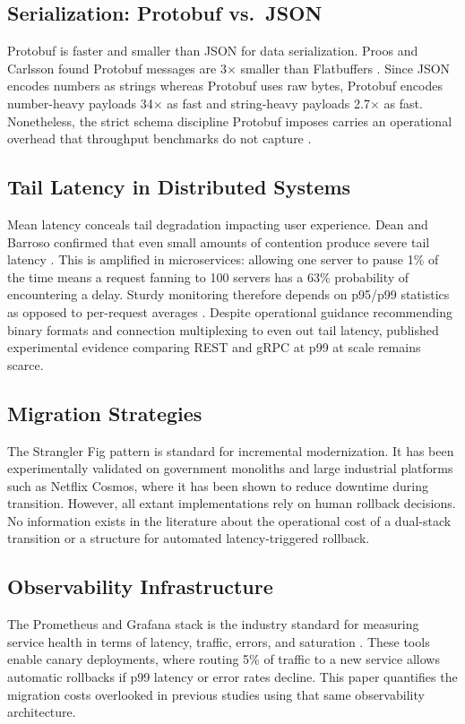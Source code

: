 \documentclass[conference]{IEEEtran}
\begin{document}
\subsection{Serialization: Protobuf vs.\ JSON}
Protobuf is faster and smaller than JSON for data serialization. Proos and Carlsson found Protobuf messages are 3$\times$ smaller than Flatbuffers \cite{proos2020}. Since JSON encodes numbers as strings whereas Protobuf uses raw bytes, Protobuf encodes number-heavy payloads 34$\times$ as fast and string-heavy payloads 2.7$\times$ as fast. Nonetheless, the strict schema discipline Protobuf imposes carries an operational overhead that throughput benchmarks do not capture \cite{popic2016}.

\subsection{Tail Latency in Distributed Systems}
Mean latency conceals tail degradation impacting user experience. Dean and Barroso confirmed that even small amounts of contention produce severe tail latency \cite{dean2013}. This is amplified in microservices: allowing one server to pause 1\% of the time means a request fanning to 100 servers has a 63\% probability of encountering a delay. Sturdy monitoring therefore depends on p95/p99 statistics as opposed to per-request averages \cite{gan2019}. Despite operational guidance recommending binary formats and connection multiplexing to even out tail latency, published experimental evidence comparing REST and gRPC at p99 at scale remains scarce.

\subsection{Migration Strategies}
The Strangler Fig pattern is standard for incremental modernization. It has been experimentally validated on government monoliths \cite{li2020} and large industrial platforms such as Netflix Cosmos, where it has been shown to reduce downtime during transition. However, all extant implementations rely on human rollback decisions. No information exists in the literature about the operational cost of a dual-stack transition or a structure for automated latency-triggered rollback.

\subsection{Observability Infrastructure}
The Prometheus and Grafana stack is the industry standard for measuring service health in terms of latency, traffic, errors, and saturation \cite{beyer2016, barrett2025}. These tools enable canary deployments, where routing 5\% of traffic to a new service allows automatic rollbacks if p99 latency or error rates decline. This paper quantifies the migration costs overlooked in previous studies using that same observability architecture.
\end{document}
